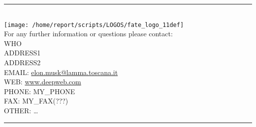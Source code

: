 \documentclass[11pt,english]{article}
\newcommand{\HRule}{\rule{\linewidth}{0.5mm}}
\begin{document}
\clearpage

\vspace{1.5cm}
\begin{flushleft}
\HRule \\[0.4cm]
{\texttt{[image: /home/report/scripts/LOGOS/fate\_logo\_11def]}}
\\
\Large{For any further information or questions please contact:
\\ WHO
\\ ADDRESS1
\\ ADDRESS2
\\ EMAIL: \href{mailto:elon.musk@lamma.toscana.it}{elon.musk@lamma.toscana.it}
\\ WEB: \href{www.deepweb.com}{www.deepweb.com}
\\ PHONE: MY\_PHONE
\\ FAX: MY\_FAX(???)
\\ OTHER: \dots}
\HRule \\[0.4cm]
\end{flushleft}

\end{document}
